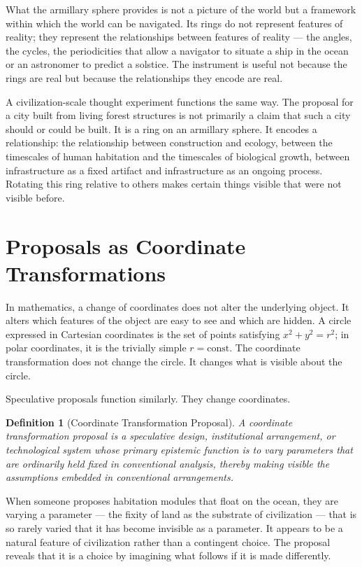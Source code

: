 \documentclass[12pt, a4paper]{article}
\theoremstyle{named}
\newtheorem{definition}{Definition}
\begin{document}
What the armillary sphere provides is not a picture of the world but a
framework within which the world can be navigated. Its rings do not
represent features of reality; they represent the relationships between
features of reality — the angles, the cycles, the periodicities that
allow a navigator to situate a ship in the ocean or an astronomer to
predict a solstice. The instrument is useful not because the rings are
real but because the relationships they encode are real.

A civilization-scale thought experiment functions the same way. The
proposal for a city built from living forest structures is not primarily
a claim that such a city should or could be built. It is a ring on an
armillary sphere. It encodes a relationship: the relationship between
construction and ecology, between the timescales of human habitation and
the timescales of biological growth, between infrastructure as a fixed
artifact and infrastructure as an ongoing process. Rotating this ring
relative to others makes certain things visible that were not visible
before.

\section{Proposals as Coordinate Transformations}

In mathematics, a change of coordinates does not alter the underlying
object. It alters which features of the object are easy to see and which
are hidden. A circle expressed in Cartesian coordinates is the set of
points satisfying $x^2 + y^2 = r^2$; in polar coordinates, it is the
trivially simple $r = \text{const}$. The coordinate transformation does
not change the circle. It changes what is visible about the circle.

Speculative proposals function similarly. They change coordinates.

\begin{definition}[Coordinate Transformation Proposal]
A coordinate transformation proposal is a speculative design,
institutional arrangement, or technological system whose primary
epistemic function is to vary parameters that are ordinarily held fixed
in conventional analysis, thereby making visible the assumptions
embedded in conventional arrangements.
\end{definition}

When someone proposes habitation modules that float on the ocean, they
are varying a parameter — the fixity of land as the substrate of
civilization — that is so rarely varied that it has become invisible as
a parameter. It appears to be a natural feature of civilization rather
than a contingent choice. The proposal reveals that it is a choice by
imagining what follows if it is made differently.
\end{document}
